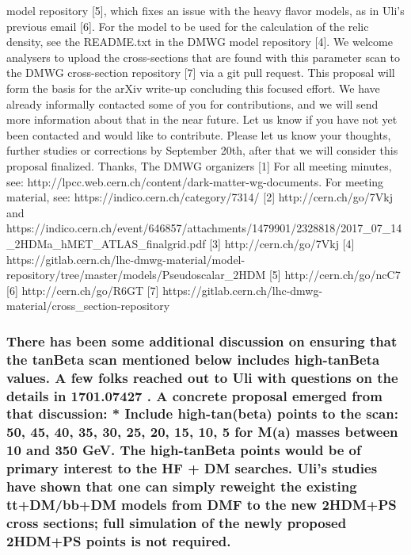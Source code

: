 {model repository {[}5{]}, which fixes an issue with the heavy flavor
models, as in Uli's previous email {[}6{]}. For the model to be used for
the calculation of the relic density, see the README.txt in the DMWG
model repository {[}4{]}. We welcome analysers to upload the
cross-sections that are found with this parameter scan to the DMWG
cross-section repository {[}7{]} via a git pull request. This proposal
will form the basis for the arXiv write-up concluding this focused
effort. We have already informally contacted some of you for
contributions, and we will send more information about that in the near
future. Let us know if you have not yet been contacted and would like to
contribute. Please let us know your thoughts, further studies or
corrections by September 20th, after that we will consider this proposal
finalized. Thanks, The DMWG organizers {[}1{]} For all meeting minutes,
see: http://lpcc.web.cern.ch/content/dark-matter-wg-documents. For
meeting material, see: https://indico.cern.ch/category/7314/ {[}2{]}
http://cern.ch/go/7Vkj and
https://indico.cern.ch/event/646857/attachments/1479901/2328818/2017\_07\_14\_2HDMa\_hMET\_ATLAS\_finalgrid.pdf
{[}3{]} http://cern.ch/go/7Vkj {[}4{]}
https://gitlab.cern.ch/lhc-dmwg-material/model-repository/tree/master/models/Pseudoscalar\_2HDM
{[}5{]} http://cern.ch/go/ncC7 {[}6{]} http://cern.ch/go/R6GT {[}7{]}
https://gitlab.cern.ch/lhc-dmwg-material/cross\_section-repository}

\subsubsection{There has been some additional discussion on ensuring
that the tanBeta scan mentioned below includes high-tanBeta values. A
few folks reached out to Uli with questions on the details in 1701.07427
. A concrete proposal emerged from that discussion: * Include
high-tan(beta) points to the scan: 50, 45, 40, 35, 30, 25, 20, 15, 10, 5
for M(a) masses between 10 and 350 GeV. The high-tanBeta points would be
of primary interest to the HF + DM searches. Uli's studies have shown
that one can simply reweight the existing tt+DM/bb+DM models from DMF to
the new 2HDM+PS cross sections; full simulation of the newly proposed
2HDM+PS points is not required.}

